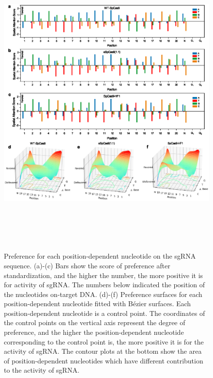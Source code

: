 \documentclass{bioinfo}
\begin{document}
\begin{figure}[!tb]
    \centerline{\includegraphics[width=178mm,height=160mm]{spatialattention.eps}}
    \caption{Preference for each position-dependent nucleotide on the sgRNA sequence. 
(a)-(c) Bars show the score of preference after standardization, and the higher the number, the more positive it is for activity of sgRNA. 
The numbers below indicated the position of the nucleotides on-target DNA. 
(d)-(f) Preference surfaces for each position-dependent nucleotide fitted with Bézier surfaces. 
Each position-dependent nucleotide is a control point. 
The coordinates of the control points on the vertical axis represent the degree of preference, 
and the higher the position-dependent nucleotide corresponding to the control point is, the more positive it is for the activity of sgRNA.
The contour plots at the bottom show the area of position-dependent nucleotides which have different contribution to the activity of sgRNA. 
}\label{fig:spatialattention}
\end{figure}
\end{document}
